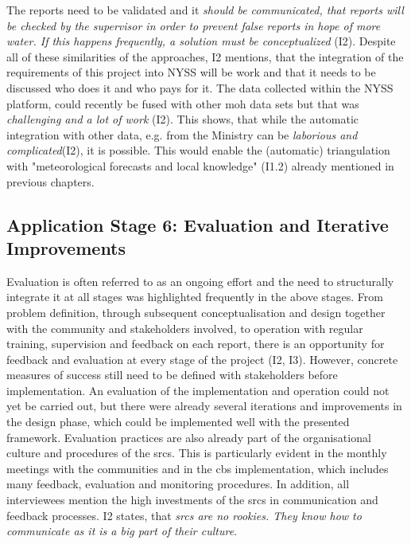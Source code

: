 The reports need to be validated and it \textit{should be communicated, that reports will be checked by the supervisor in order to prevent false reports in hope of more water. If this happens frequently, a solution must be conceptualized} (I2). Despite all of these similarities of the approaches, I2 mentions, that the integration of the requirements of this project into NYSS will be work and that it needs to be discussed who does it and who pays for it.\newline
The data collected within the NYSS platform, could recently be fused with other \acrshort{moh} data sets but that was \textit{challenging and a lot of work} (I2). This shows, that while the automatic integration with other data, e.g. from the Ministry can be \textit{laborious and complicated}(I2), it is possible. This would enable the (automatic) triangulation with "meteorological forecasts and local knowledge" (I1.2) already mentioned in previous chapters.


\subsection{Application Stage 6: Evaluation and Iterative Improvements}

Evaluation is often referred to as an ongoing effort and the need to structurally integrate it at all stages was highlighted frequently in the above stages. From problem definition, through subsequent conceptualisation and design together with the community and stakeholders involved, to operation with regular training, supervision and feedback on each report, there is an opportunity for feedback and evaluation at every stage of the project (I2, I3). However, concrete measures of success still need to be defined with stakeholders before implementation. An evaluation of the implementation and operation could not yet be carried out, but there were already several iterations and improvements in the design phase, which could be implemented well with the presented framework.\newline
Evaluation practices are also already part of the organisational culture and procedures of the \acrshort{srcs}. This is particularly evident in the monthly meetings with the communities and in the \acrshort{cbs} implementation, which includes many feedback, evaluation and monitoring procedures. In addition, all interviewees mention the high investments of the \acrshort{srcs} in communication and feedback processes. I2 states, that \textit{\acrshort{srcs} are no rookies. They know how to communicate as it is a big part of their culture}.

